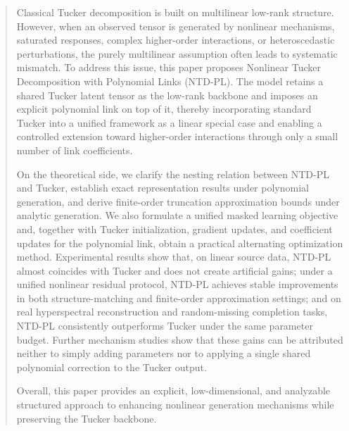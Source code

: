 \begin{abstract}
Classical Tucker decomposition is built on multilinear low-rank structure. However, when an observed tensor is generated by nonlinear mechanisms, saturated responses, complex higher-order interactions, or heteroscedastic perturbations, the purely multilinear assumption often leads to systematic mismatch. To address this issue, this paper proposes Nonlinear Tucker Decomposition with Polynomial Links (NTD-PL). The model retains a shared Tucker latent tensor as the low-rank backbone and imposes an explicit polynomial link on top of it, thereby incorporating standard Tucker into a unified framework as a linear special case and enabling a controlled extension toward higher-order interactions through only a small number of link coefficients.

On the theoretical side, we clarify the nesting relation between NTD-PL and Tucker, establish exact representation results under polynomial generation, and derive finite-order truncation approximation bounds under analytic generation. We also formulate a unified masked learning objective and, together with Tucker initialization, gradient updates, and coefficient updates for the polynomial link, obtain a practical alternating optimization method. Experimental results show that, on linear source data, NTD-PL almost coincides with Tucker and does not create artificial gains; under a unified nonlinear residual protocol, NTD-PL achieves stable improvements in both structure-matching and finite-order approximation settings; and on real hyperspectral reconstruction and random-missing completion tasks, NTD-PL consistently outperforms Tucker under the same parameter budget. Further mechanism studies show that these gains can be attributed neither to simply adding parameters nor to applying a single shared polynomial correction to the Tucker output.

Overall, this paper provides an explicit, low-dimensional, and analyzable structured approach to enhancing nonlinear generation mechanisms while preserving the Tucker backbone.
\end{abstract}
